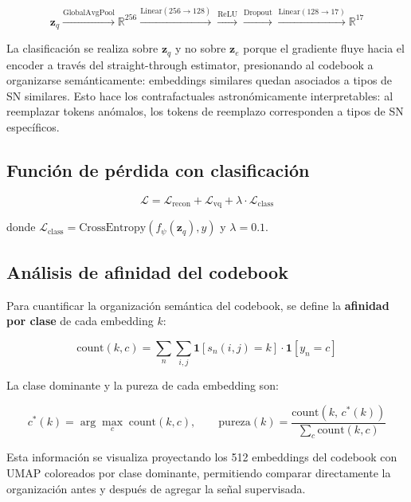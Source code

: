 \begin{equation}
\mathbf{z}_q \xrightarrow{\text{GlobalAvgPool}} \mathbb{R}^{256} \xrightarrow{\text{Linear}(256 \to 128)} \xrightarrow{\text{ReLU}} \xrightarrow{\text{Dropout}} \xrightarrow{\text{Linear}(128 \to 17)} \mathbb{R}^{17}
\end{equation}

La clasificación se realiza sobre $\mathbf{z}_q$ y no sobre $\mathbf{z}_e$ porque el gradiente fluye hacia el encoder a través del straight-through estimator, presionando al codebook a organizarse semánticamente: embeddings similares quedan asociados a tipos de SN similares. Esto hace los contrafactuales astronómicamente interpretables: al reemplazar tokens anómalos, los tokens de reemplazo corresponden a tipos de SN específicos.

\subsection{Función de pérdida con clasificación}

\begin{equation}
\mathcal{L} = \mathcal{L}_{\text{recon}} + \mathcal{L}_{\text{vq}} + \lambda \cdot \mathcal{L}_{\text{class}}
\end{equation}

donde $\mathcal{L}_{\text{class}} = \text{CrossEntropy}(f_\psi(\mathbf{z}_q), y)$ y $\lambda = 0.1$.

\subsection{Análisis de afinidad del codebook}

Para cuantificar la organización semántica del codebook, se define la \textbf{afinidad por clase} de cada embedding $k$:

\begin{equation}
\text{count}(k, c) = \sum_{n} \sum_{i,j} \mathbf{1}[s_n(i,j) = k] \cdot \mathbf{1}[y_n = c]
\end{equation}

La clase dominante y la pureza de cada embedding son:

\begin{equation}
c^*(k) = \arg\max_c \; \text{count}(k, c), \qquad
\text{pureza}(k) = \frac{\text{count}(k,\, c^*(k))}{\sum_c \text{count}(k, c)}
\end{equation}

Esta información se visualiza proyectando los 512 embeddings del codebook con UMAP coloreados por clase dominante, permitiendo comparar directamente la organización antes y después de agregar la señal supervisada.

